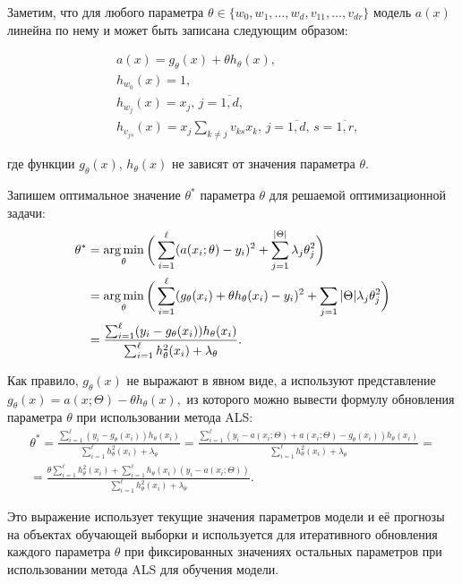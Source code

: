 \documentclass[12pt,a4paper]{article}
\begin{document}
\begin{esSolution}
	Заметим, что для любого параметра $\theta \in \{w_0, w_1, \dots, w_d, v_{11}, \dots, v_{dr} \}$ модель $a(x)$ линейна по нему и может быть записана следующим образом:

\begin{align*}
	&a(x) = g_{\theta}(x) + \theta h_{\theta}(x),\\
	&h_{w_0}(x) = 1,\\
	&h_{w_j}(x) = x_j, \, j = \overline{1,d},\\
	&h_{v_{js}}(x) = x_j \sum_{k \ne j} v_{ks} x_k, \, j = \overline{1, d}, \, s = \overline{1, r},
\end{align*}

где функции $g_{\theta}(x)$, $h_{\theta}(x)$ не зависят от значения параметра $\theta$.

Запишем оптимальное значение $\theta^*$ параметра $\theta$ для решаемой оптимизационной задачи:
\begin{align*}
    \theta^* & = \mathop{\rm arg\,min}\limits_{\theta} \bigg( \sum_{i=1}^\ell (a(x_i; \theta) - y_i)^2 + \sum_{j = 1}^{|\Theta|}\lambda_j \theta_j^2 \bigg)\\
	& = \mathop{\rm arg\,min}\limits_{\theta} \bigg( \sum_{i=1}^\ell (g_{\theta}(x_i) + \theta h_{\theta}(x_i) - y_i)^2 + \sum_{j = 1}{|\Theta|}\lambda_j \theta_j^2 \bigg)\\
	& = \frac{\sum_{i=1}^\ell (y_i - g_{\theta}(x_i))h_{\theta}(x_i)}{\sum_{i=1}^\ell h_{\theta}^2(x_i) + \lambda_{\theta}}.
\end{align*}
\end{esSolution}

Как правило, $g_\theta(x)$ не выражают в явном виде, а используют представление $g_\theta(x) = a(x; \Theta) - \theta h_\theta(x),$ из которого можно вывести формулу обновления параметра $\theta$ при использовании метода ALS:
\begin{align*}
	\theta^* = \frac{\sum_{i=1}^\ell (y_i - g_{\theta}(x_i))h_{\theta}(x_i)}{\sum_{i=1}^\ell h_{\theta}^2(x_i) + \lambda_{\theta}}=
	\frac{\sum_{i=1}^\ell (y_i - a(x_i; \Theta) + a(x_i; \Theta) - g_{\theta}(x_i))h_{\theta}(x_i)}{\sum_{i=1}^\ell h_{\theta}^2(x_i) + \lambda_{\theta}}=\\
	= \frac{\theta \sum_{i=1}^\ell h_{\theta}^2(x_i) + \sum_{i=1}^\ell h_{\theta}(x_i) (y_i - a(x_i; \Theta))}{\sum_{i=1}^\ell h_{\theta}^2(x_i) + \lambda_{\theta}}.
\end{align*}

Это выражение использует текущие значения параметров модели и её прогнозы на объектах обучающей выборки и используется для итеративного обновления каждого параметра $\theta$ при фиксированных значениях остальных параметров при использовании метода ALS для обучения модели.
\end{document}
